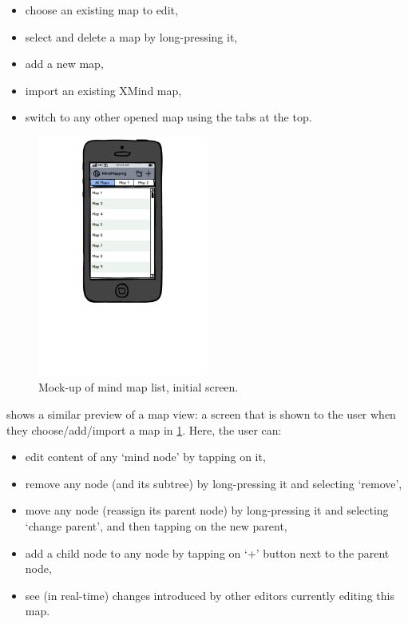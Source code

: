 \begin{itemize}
	\item choose an existing map to edit,
	\item select and delete a map by long-pressing it,
	\item add a new map,
	\item import an existing XMind map,
	\item switch to any other opened map using the tabs at the top.
\end{itemize}

\begin{figure}[h]
	\centering
	\includegraphics[width=0.5\textwidth]{graphics-mockup-list}
	\caption{Mock-up of mind map list, initial screen.}
	\label{fig:mockup-maplist}
\end{figure}

 shows a similar preview of a map view: a screen that is shown to the user when they choose/add/import a map in \cref{fig:mockup-maplist}. Here, the user can:

\begin{itemize}
	\item edit content of any `mind node' by tapping on it,
	\item remove any node (and its subtree) by long-pressing it and selecting `remove',
	\item move any node (reassign its parent node) by long-pressing it and selecting `change parent', and then tapping on the new parent,
	\item add a child node to any node by tapping on `+' button next to the parent node,
	\item see (in real-time) changes introduced by other editors currently editing this map.
\end{itemize}

